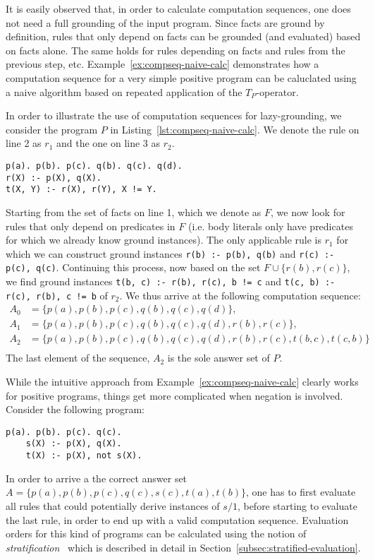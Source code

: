 It is easily observed that, in order to calculate computation sequences, one does not need a full grounding of the input program. Since facts are ground by definition, rules that only depend on facts can be grounded (and evaluated) based on facts alone. The same holds for rules depending on facts and rules from the previous step, etc. Example~\ref{ex:compseq-naive-calc} demonstrates how a computation sequence for a very simple positive program can be caluclated using a naive algorithm based on repeated application of the $T_P$-operator.

\begin{example}
\label{ex:compseq-naive-calc}
In order to illustrate the use of computation sequences for lazy-grounding, we consider the program $P$ in Listing~\ref{lst:compseq-naive-calc}. We denote the rule on line 2 as $r_1$ and the one on line 3 as $r_2$.
\begin{lstlisting}[style=asp-code, label={lst:compseq-naive-calc}, caption={A positive, non-ground program}]
p(a). p(b). p(c). q(b). q(c). q(d).
r(X) :- p(X), q(X).
t(X, Y) :- r(X), r(Y), X != Y.	
\end{lstlisting}
Starting from the set of facts on line 1, which we denote as $F$, we now look for rules that only depend on predicates in $F$ (i.e. body literals only have predicates for which we already know ground instances). The only applicable rule is $r_1$ for which we  can construct ground instances \texttt{r(b) :- p(b), q(b)} and \texttt{r(c) :- p(c), q(c)}. Continuing this process, now based on the set $F \cup \{r(b),r(c)\}$, we find ground instances \texttt{t(b, c) :- r(b), r(c), b != c} and \texttt{t(c, b) :- r(c), r(b), c != b} of $r_2$. We thus arrive at the following computation sequence:
\begin{align*}
	A_0 &= \{p(a), p(b), p(c), q(b), q(c), q(d)\},\\
	A_1 &= \{p(a), p(b), p(c), q(b), q(c), q(d), r(b), r(c)\},\\
	A_2 &= \{p(a), p(b), p(c), q(b), q(c), q(d), r(b), r(c), t(b, c), t(c, b)\}\\
\end{align*}	
The last element of the sequence, $A_2$ is the sole answer set of $P$.
\end{example}	

While the intuitive approach from Example~\ref{ex:compseq-naive-calc} clearly works for positive programs, things get more complicated when negation is involved. Consider the following program:
\begin{lstlisting}[style=asp-code]
	p(a). p(b). p(c). q(c).
	s(X) :- p(X), q(X).
	t(X) :- p(X), not s(X).
\end{lstlisting}
In order to arrive a the correct answer set $A = \{p(a), p(b), p(c), q(c), s(c), t(a), t(b)\}$, one has to first evaluate all rules that could potentially derive instances of $s/1$, before starting to evaluate the last rule, in order to end up with a valid computation sequence. Evaluation orders for this kind of programs can be calculated using the notion of \emph{stratification}~\cite{stratification} which is described in detail in Section~\ref{subsec:stratified-evaluation}.

